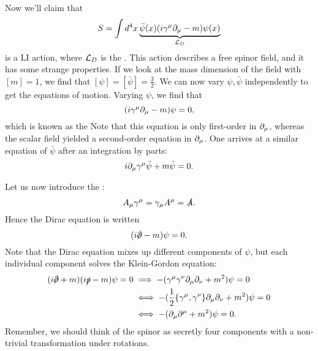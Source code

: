 Now we'll claim that
$$S=\int d^4x \underbrace{\bar \psi(x)(i \gamma^\mu \partial_\mu -m)\psi(x)}_{\mathcal L_D}$$
is a LI action, where $\mathcal L_D$ is the . This action describes a free spinor field, and it has some strange properties. If we look at the mass dimension of the field with $[m]=1$, we find that $[\psi]=[\bar\psi]=\frac{3}{2}$. We can now vary $\psi,\bar\psi$ independently to get the equations of motion. Varying $\psi$, we find that
$$(i\gamma^\mu \partial_\mu -m)\psi=0,$$
which is known as the  Note that this equation is only first-order in $\partial_\mu$, whereas the scalar field yielded a second-order equation in $\partial_\mu$. One arrives at a similar equation of $\bar \psi$ after an integration by parts:
$$i\partial_\mu \gamma^\mu \bar \psi + m \bar \psi=0.$$

Let us now introduce the :
$$A_\mu \gamma^\mu = \gamma_\mu A^\mu = \slashed{A}.$$
Hence the Dirac equation is written
$$(i\slashed{\p}-m)\psi=0.$$
Note that the Dirac equation mixes up different components of $\psi$, but each individual component solves the Klein-Gordon equation:
\begin{align*}
    (i\slashed{\p}+m)(i\slashed{p}-m)\psi=0
    &\implies -(\gamma^\mu \gamma^\nu \p_\mu \p_\nu +m^2)\psi=0\\
    &\iff -(\frac{1}{2}\set{\gamma^\mu, \gamma^\nu}\p_\mu \p_\nu +m^2)\psi =0\\
    &\iff -(\p_\mu \p^\mu+m^2)\psi =0.
\end{align*}
Remember, we should think of the spinor as secretly four components with a non-trivial transformation under rotations.

